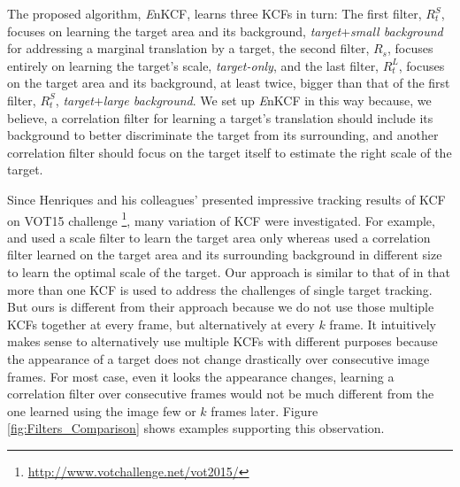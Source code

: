 \documentclass{bmvc2k}
\begin{document}
The proposed algorithm, {\it E}nKCF, learns three KCFs in turn: The
first filter, $R_{t}^{S}$, focuses on learning the target area and its
background, \textit{target}+\textit{small background} for addressing a
marginal translation by a target, the second filter, $R_{s}$, focuses
entirely on learning the target's scale, \textit{target-only}, and the
last filter, $R_{t}^{L}$, focuses on the target area and its
background, at least twice, bigger than that of the first filter,
$R_{t}^{S}$, \textit{target}+\textit{large background}. We set up {\it
  E}nKCF in this way because, we believe, a correlation filter for
learning a target's translation should include its background to
better discriminate the target from its surrounding, and another
correlation filter should focus on the target itself to estimate the
right scale of the target. 

Since Henriques and his colleagues' presented impressive tracking
results of KCF \cite{henriques2015high} on VOT15
challenge \footnote{\url{http://www.votchallenge.net/vot2015/}}, many
variation of KCF were investigated. For example, \cite{ma2015long} and
\cite{danelljan2014accurate} used a scale filter to learn the target
area only whereas \cite{li2014scale, bibi2015multi, tang2015multi}
used a correlation filter learned on the target area and its
surrounding background in different size to learn the optimal scale of
the target. Our approach is similar to that of \cite{ma2015long} in
that more than one KCF is used to address the challenges of single
target tracking. But ours is different from their approach because we
do not use those multiple KCFs together at every frame, but
alternatively at every $k$ frame. It intuitively makes sense to
alternatively use multiple KCFs with different purposes because the
appearance of a target does not change drastically over consecutive
image frames. For most case, even it looks the appearance changes,
learning a correlation filter over consecutive frames would not be
much different from the one learned using the image few or $k$ frames
later. Figure \ref{fig:Filters_Comparison} shows examples supporting
this observation.
\end{document}
